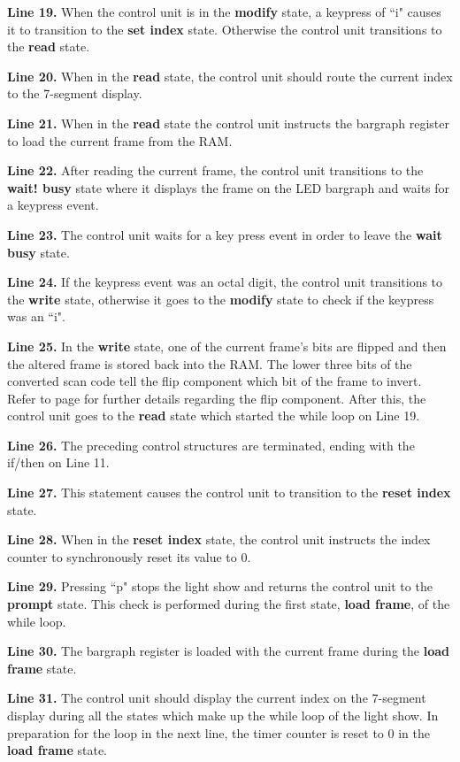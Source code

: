 {\bf Line 19.} When the control unit is in the {\bf modify} state, a keypress of ``i" 
causes it to transition to the {\bf set index} state.  Otherwise the control 
unit transitions to the {\bf read} state.  

{\bf Line 20.} When in the {\bf read} state, the control unit should route the current 
index to the 7-segment display.

{\bf Line 21.} When in the {\bf read} state the control unit instructs the bargraph register 
to load the current frame from the RAM.


{\bf Line 22.} After reading the current frame, the control unit transitions 
to the {\bf wait! busy} state where it displays the frame on the LED bargraph 
and waits for a keypress event.

{\bf Line 23.} The control unit waits for a key press event in order 
to leave the {\bf wait busy} state.

{\bf Line 24.} If the keypress event was an octal digit, the control 
unit transitions to the {\bf write} state, otherwise it goes to the 
{\bf modify} state to check if the keypress was an ``i".

{\bf Line 25.}  In the {\bf write} state, one of the current frame's 
bits are flipped and then the altered frame is stored back into the 
RAM.  The lower three bits of the converted scan code tell the flip 
component which bit of the frame to invert.  Refer to 
page \pageref{page:flipbox} for further details regarding the flip 
component.  After this, the control unit goes to the {\bf read} state 
which started the while loop on Line 19.

{\bf Line 26.} The preceding control structures are terminated, ending with the if/then on Line 11.

{\bf Line 27.} This statement causes the control unit to transition to the 
{\bf reset index} state.

{\bf Line 28.} When in the {\bf reset index} state, the control unit instructs the index 
counter to synchronously reset its value to 0.

{\bf Line 29.} Pressing ``p" stops the light show and returns the control unit to the 
{\bf prompt} state.  This check is performed during the first state, {\bf load frame}, 
of the while loop.

{\bf Line 30.} The bargraph register is loaded with the current frame during the 
{\bf load frame} state.

{\bf Line 31.} The control unit should display the current index on the 7-segment display 
during all the states which make up the while loop of the light show.  In preparation for 
the loop in the next line, the timer counter is reset to 0 in the {\bf load frame}
 state.

